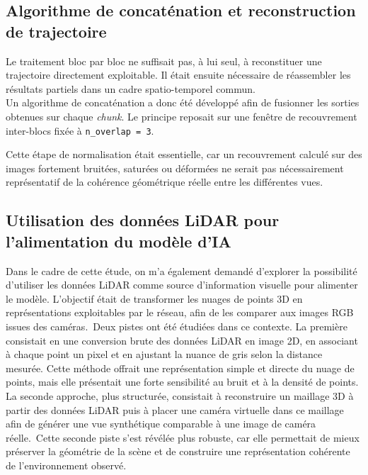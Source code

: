 \documentclass[12pt,a4paper,oneside]{report}
\begin{document}
\subsection{Algorithme de concaténation et reconstruction de trajectoire}

\hspace*{.3cm}Le traitement bloc par bloc ne suffisait pas, à lui seul, à reconstituer une trajectoire directement exploitable. Il était ensuite nécessaire de réassembler les résultats partiels dans un cadre spatio-temporel commun.\\
\hspace*{.3cm}Un algorithme de concaténation a donc été développé afin de fusionner les sorties obtenues sur chaque \textit{chunk}. Le principe reposait sur une fenêtre de recouvrement inter-blocs fixée à \texttt{n\_overlap = 3}.\\

\par\bigskip
Cette étape de normalisation était essentielle, car un recouvrement calculé sur des images fortement bruitées, saturées ou déformées ne serait pas nécessairement représentatif de la cohérence géométrique réelle entre les différentes vues.\\

\par\bigskip
\par\bigskip

\subsection{Utilisation des données LiDAR pour l'alimentation du modèle d'IA}

\hspace*{.3cm}Dans le cadre de cette étude, on m'a également demandé d'explorer la possibilité d'utiliser les données LiDAR comme source d'information visuelle pour alimenter le modèle. L'objectif était de transformer les nuages de points 3D en représentations exploitables par le réseau, afin de les comparer aux images RGB issues des caméras.\
\hspace*{.3cm}Deux pistes ont été étudiées dans ce contexte. La première consistait en une conversion brute des données LiDAR en image 2D, en associant à chaque point un pixel et en ajustant la nuance de gris selon la distance mesurée. Cette méthode offrait une représentation simple et directe du nuage de points, mais elle présentait une forte sensibilité au bruit et à la densité de points. La seconde approche, plus structurée, consistait à reconstruire un maillage 3D à partir des données LiDAR puis à placer une caméra virtuelle dans ce maillage afin de générer une vue synthétique comparable à une image de caméra réelle.\
\hspace*{.3cm}Cette seconde piste s'est révélée plus robuste, car elle permettait de mieux préserver la géométrie de la scène et de construire une représentation cohérente de l'environnement observé.\
\end{document}
